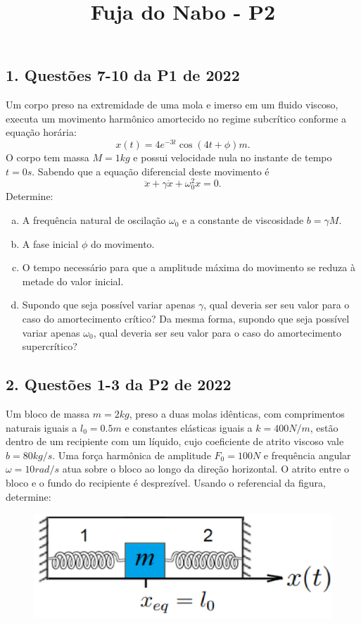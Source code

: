 \documentclass[a4paper,10pt]{article}
\title{\Huge{\textbf{Fuja do Nabo - P2}}}
\date{\vspace{-10ex}}
\begin{document}
\maketitle

\subsection*{1. Questões 7-10 da P1 de 2022}

Um corpo preso na extremidade de uma mola e imerso em um
fluido viscoso, executa um movimento harmônico amortecido no regime subcrítico conforme a equação
horária:
$$
x(t) = 4 e^{-3t} \cos(4t + \phi) \unit{m}.
$$
O corpo tem massa $M=1 \unit{kg}$ e possui velocidade nula no instante de tempo $t = 0 \unit{s}$. Sabendo que
a equação diferencial deste movimento é
$$
\ddot{x} + \gamma \dot{x} + \omega_0^2x = 0.
$$
Determine:

\begin{enumerate}[(a)]
\item A frequência natural de oscilação $\omega_0$ e a constante de viscosidade $b = \gamma M$.

\item A fase inicial $\phi$ do movimento.

\item O tempo necessário para que a amplitude máxima do movimento se reduza à metade do valor inicial.

\item Supondo que seja possível variar apenas $\gamma$, qual deveria ser seu valor para o caso
do amortecimento crítico? Da mesma forma, supondo que seja possível variar apenas $\omega_0$, qual
deveria ser seu valor para o caso do amortecimento supercrítico?
\end{enumerate}

\n\n

\subsection*{2. Questões 1-3 da P2 de 2022}

Um bloco de massa $m = 2 \unit{kg}$, preso a duas molas idênticas, com
comprimentos naturais iguais a $l_0 = 0.5 \unit{m}$ e constantes elásticas iguais a $k = 400 \unit{N/m}$, estão dentro
de um recipiente com um líquido, cujo coeficiente de atrito viscoso vale $b = 80 \unit{kg/s}$. Uma força
harmônica de amplitude $F_0 = 100 \unit{N}$ e frequência angular $\omega = 10 \unit{rad/s}$ atua sobre o bloco ao
longo da direção horizontal. O atrito entre o bloco e o fundo do recipiente é desprezível. Usando o
referencial da figura, determine:
\begin{figure}[H]
\centering
\includegraphics[width=0.7\linewidth]{fig/duas_molas.png}
\label{fig:duas_molas}
\end{figure}
\end{document}
